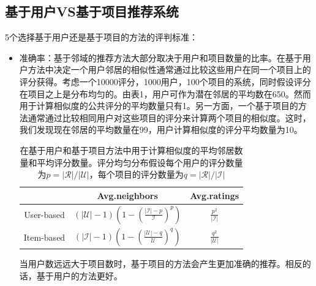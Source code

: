 \documentclass{article}
\begin{document}
 \subsection{基于用户VS基于项目推荐系统}
 5个选择基于用户还是基于项目的方法的评判标准：
 \begin{itemize}
 \item 准确率：基于邻域的推荐方法大部分取决于用户和项目数量的比率。在基于用户方法中决定一个用户邻居的相似性通常通过比较这些用户在同一个项目上的评分获得。考虑一个10000评分，1000用户，100个项目的系统，同时假设评分在项目之上是分布均匀的。由表1，用户可作为潜在邻居的平均数在650。然而用于计算相似度的公共评分的平均数量只有1。另一方面，一个基于项目的方法通常通过比较相同用户对这些项目的评分来计算两个项目的相似度。这时，我们发现现在邻居的平均数量在99，用户计算相似度的评分平均数量为10。
 \begin{table}[!htb]
 \centering
 \caption{在基于用户和基于项目方法中用于计算相似度的平均邻居数量和平均评分数量。评分均匀分布假设每个用户的评分数量为$p=|\mathcal{R}|/|\mathcal{U}|$，每个项目的评分数量为$q=|\mathcal{R}|/|\mathcal{I}|$}
 	\begin{tabular}{c||c|c} \hline
 	           & Avg.neighbors & Avg.ratings \\ \hline
 	User-based & $(|\mathcal{U}|-1)\left(1-\left(\frac{|\mathcal{I}|-p}{\mathcal{I}}\right)^p\right)$ & $\frac{p^2}{|\mathcal{I}|}$ \\ \hline
 	Item-based & $(|\mathcal{I}|-1)\left(1-\left(\frac{|\mathcal{U}|-q}{\mathcal{U}}\right)^q\right)$ & $\frac{q^2}{|\mathcal{U}|}$ \\ \hline
 	\end{tabular}
 \end{table}

 当用户数远远大于项目数时，基于项目的方法会产生更加准确的推荐。相反的话，基于用户的方法更好。


\end{itemize}
\end{document}
